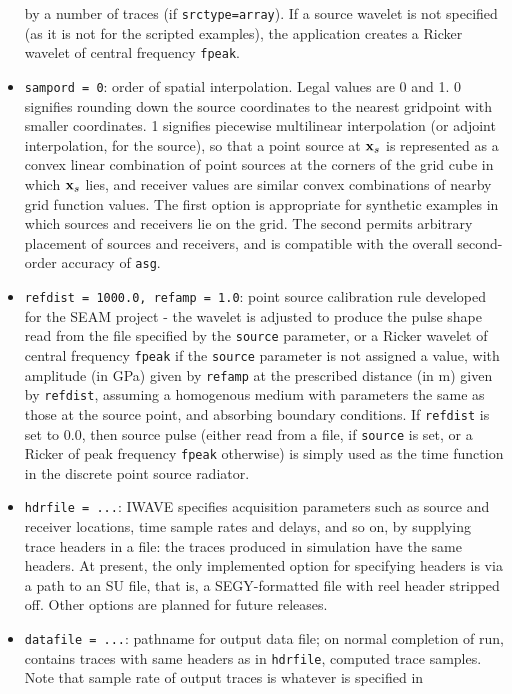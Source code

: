 \begin{itemize}
  by a number of traces (if {\tt srctype=array}). If a source wavelet is not specified (as
  it is not for the scripted examples), the application creates a Ricker wavelet of central
  frequency {\tt fpeak}.
\item{\tt sampord = 0}: order of spatial interpolation. Legal values
  are 0 and 1. 0 signifies rounding down the source coordinates to the
  nearest gridpoint with smaller coordinates. 1 signifies piecewise
  multilinear interpolation (or adjoint interpolation, for the
  source), so that a point source at ${\bf x}_s$ is
  represented as a convex linear combination of point sources at
  the corners of the grid cube in which ${\bf x}_s$ lies, and receiver values
  are similar convex combinations of nearby grid function values. The first option is
  appropriate for synthetic examples in which sources and receivers
  lie on the grid. The second permits arbitrary placement of sources
  and receivers, and is compatible with the overall second-order
  accuracy of {\tt asg}.
\item {\tt refdist = 1000.0, refamp = 1.0}: point source calibration
  rule developed for the SEAM project - the wavelet is
  adjusted to produce the pulse shape read from the file specified by
  the {\tt source} parameter, or a Ricker wavelet of central frequency
  {\tt fpeak} if the {\tt source} parameter is not assigned a value,
  with amplitude (in GPa) given by {\tt refamp} at the
  prescribed distance (in m) given by {\tt refdist}, assuming a homogenous medium with
  parameters the same as those at the source point, and absorbing
  boundary conditions. If {\tt refdist} is set to $0.0$, then source
  pulse (either read from a file, if {\tt source} is set, or a Ricker
  of peak frequency {\tt fpeak} otherwise) is simply used as the time
  function in the discrete point source radiator. 
\item {\tt hdrfile = ...}: IWAVE specifies acquisition parameters
  such as source and receiver locations, time sample rates and delays,
  and so on, by supplying trace headers in a file: the traces produced
  in simulation have the same headers. At present, the only
  implemented option for specifying headers is via a path to an SU
  file, that is, a SEGY-formatted file with reel header stripped
  off. Other options are planned for future releases.
\item {\tt datafile = ...}: pathname for output data file; on normal
  completion of run, contains traces with
  same headers as in {\tt hdrfile}, computed trace samples. Note that
  sample rate of output traces is whatever is specified in {\tt
}
\end{itemize}
